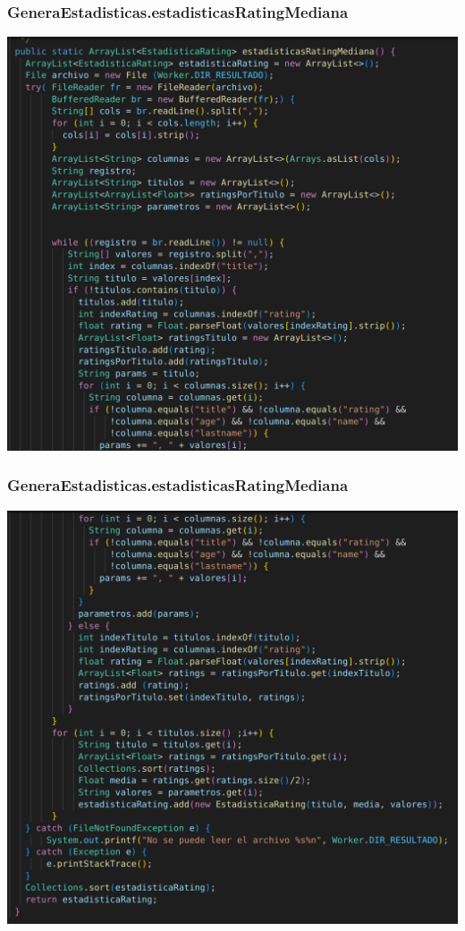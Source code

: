 \documentclass{beamer}
\begin{document}
\begin{frame}
\frametitle{GeneraEstadisticas.estadisticasRatingMediana}
\includegraphics[width=0.9\linewidth]{generaestadisticas_estadisticasratingmediana1}
\end{frame}

\begin{frame}
\frametitle{GeneraEstadisticas.estadisticasRatingMediana}
\includegraphics[width=0.9\linewidth]{generaestadisticas_estadisticasratingmediana2}
\end{frame}
\end{document}
